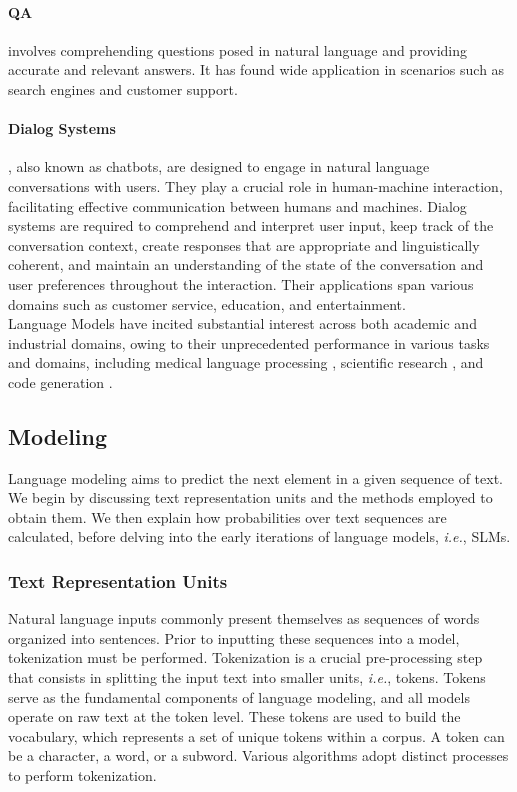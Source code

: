 \paragraph{\ac{QA}} involves comprehending questions posed in natural language and providing accurate and relevant answers. It has found wide application in scenarios such as search engines and customer support.

\paragraph{Dialog Systems}, also known as chatbots, are designed to engage in natural language conversations with users. They play a crucial role in human-machine interaction, facilitating effective communication between humans and machines. Dialog systems are required to comprehend and interpret user input, keep track of the conversation context, create responses that are appropriate and linguistically coherent, and maintain an understanding of the state of the conversation and user preferences throughout the interaction. Their applications span various domains such as customer service, education, and entertainment. \\

Language Models have incited substantial interest across both academic and industrial domains, owing to their unprecedented performance in various tasks and domains, including medical language processing \citep{thirunavukarasu2023large}, scientific research \citep{wang2023scientific}, and code generation \citep{xu2022systematic}.

\subsection{Modeling}

Language modeling aims to predict the next element in a given sequence of text. We begin by discussing text representation units and the methods employed to obtain them. We then explain how probabilities over text sequences are calculated, before delving into the early iterations of language models, \textit{i.e.}, \acp{SLM}.

\subsubsection{Text Representation Units}

Natural language inputs commonly present themselves as sequences of words organized into sentences. Prior to inputting these sequences into a model, tokenization must be performed. Tokenization is a crucial pre-processing step that consists in splitting the input text into smaller units, \textit{i.e.}, tokens. Tokens serve as the fundamental components of language modeling, and all models operate on raw text at the token level. These tokens are used to build the vocabulary, which represents a set of unique tokens within a corpus. A token can be a character, a word, or a subword. Various algorithms adopt distinct processes to perform tokenization. 


